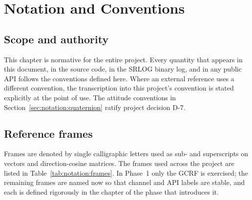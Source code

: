\chapter{Notation and Conventions}
\label{ch:notation}

\section{Scope and authority}

This chapter is normative for the entire project. Every quantity that appears
in this document, in the source code, in the SRLOG binary log, and in any
public API follows the conventions defined here. Where an external reference
uses a different convention, the transcription into this project's convention
is stated explicitly at the point of use. The attitude conventions in
Section~\ref{sec:notation:quaternion} ratify project decision D-7.

\section{Reference frames}
\label{sec:notation:frames}

Frames are denoted by single calligraphic letters used as sub- and
superscripts on vectors and direction-cosine matrices. The frames used across
the project are listed in Table~\ref{tab:notation:frames}. In Phase~1 only the
GCRF is exercised; the remaining frames are named now so that channel and API
labels are stable, and each is defined rigorously in the chapter of the phase
that introduces it.

